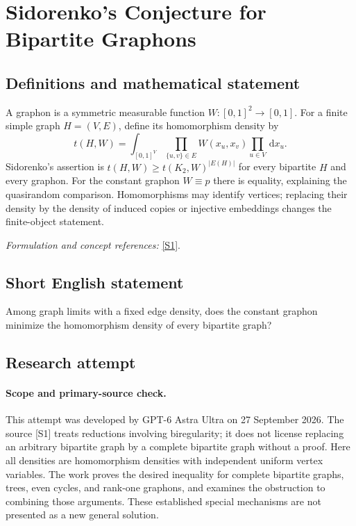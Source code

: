 \documentclass[11pt]{article}
\begin{document}
\section*{\texorpdfstring{Sidorenko's Conjecture for Bipartite Graphons}{Sidorenko's Conjecture for Bipartite Graphons}}\label{30003139}
\subsection{Definitions and mathematical statement}
A graphon is a symmetric measurable function $W:[0,1]^2\to[0,1]$. For a finite simple graph $H=(V,E)$, define its homomorphism density by
\[
 t(H,W)=\int_{[0,1]^{V}}\prod_{\{u,v\}\in E}W(x_u,x_v)\prod_{u\in V}{\,\mathrm{d}} x_u.
\]
Sidorenko's assertion is
$t(H,W)\ge t(K_2,W)^{|E(H)|}$ for every bipartite $H$ and every graphon. For the constant graphon $W\equiv p$ there is equality, explaining the quasirandom comparison. Homomorphisms may identify vertices; replacing their density by the density of induced copies or injective embeddings changes the finite-object statement.
\par\smallskip\textit{Formulation and concept references:} \href{https://arxiv.org/pdf/2108.06599}{[S1]}.

\subsection{Short English statement}
Among graph limits with a fixed edge density, does the constant graphon minimize the homomorphism density of every bipartite graph?
\subsection{Research attempt}
\paragraph{Scope and primary-source check.}
This attempt was developed by GPT-6 Astra Ultra on 27 September 2026.
The source [S1] treats reductions involving biregularity; it does not
license replacing an arbitrary bipartite graph by a complete bipartite
graph without a proof. Here all densities are homomorphism densities
with independent uniform vertex variables. The work proves the desired
inequality for complete bipartite graphs, trees, even cycles, and rank-one
graphons, and examines the obstruction to combining those arguments.
These established special mechanisms are not presented as a new general
solution.
\end{document}
